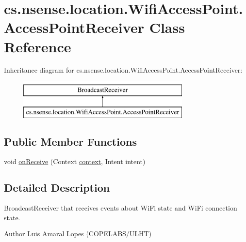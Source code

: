 \hypertarget{classcs_1_1nsense_1_1location_1_1_wifi_access_point_1_1_access_point_receiver}{\section{cs.\-nsense.\-location.\-Wifi\-Access\-Point.\-Access\-Point\-Receiver Class Reference}
\label{classcs_1_1nsense_1_1location_1_1_wifi_access_point_1_1_access_point_receiver}
}
Inheritance diagram for cs.\-nsense.\-location.\-Wifi\-Access\-Point.\-Access\-Point\-Receiver\-:\begin{figure}[H]
\begin{center}
\leavevmode
\includegraphics[height=2.000000cm]{classcs_1_1nsense_1_1location_1_1_wifi_access_point_1_1_access_point_receiver}
\end{center}
\end{figure}
\subsection*{Public Member Functions}
\begin{DoxyCompactItemize}
\item 
void \hyperlink{classcs_1_1nsense_1_1location_1_1_wifi_access_point_1_1_access_point_receiver_aee0dca22a031f5e84fa30b6c95c7c7f9}{on\-Receive} (Context \hyperlink{classcs_1_1nsense_1_1location_1_1_wifi_access_point_a5fd56b2fb85ff6005d6802e158d116ff}{context}, Intent intent)
\end{DoxyCompactItemize}


\subsection{Detailed Description}
Broadcast\-Receiver that receives events about Wi\-Fi state and Wi\-Fi connection state. \begin{DoxyAuthor}{Author}
Luis Amaral Lopes (C\-O\-P\-E\-L\-A\-B\-S/\-U\-L\-H\-T) 
\end{DoxyAuthor}


